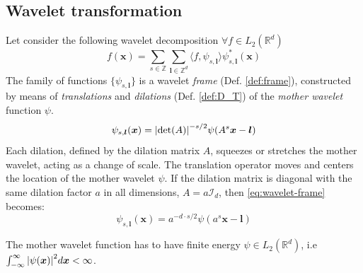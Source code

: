 \documentclass{InsightArticle}
\theoremstyle{definition}
\newcommand{\conj}[1]{#1^{\ast}}
\begin{document}
\subsection{Wavelet transformation}
\label{sub:transform}

Let consider the following wavelet decomposition $\forall f \in L_2(\mathbb{R}^d)$
\begin{equation}
    f(\bm{x}) = \sum_{s \in \mathbb{Z}} \sum_{\bm{l} \in \mathbb{Z}^d} \langle f,\psi_{s,\bm{l}} \rangle \conj\psi_{s,\bm{l}}(\bm{x})
\end{equation}
The family of functions $\{\psi_{s,\bm{l}}\}$ is a wavelet \textit{frame} (Def. \ref{def:frame}), constructed by means of \textit{translations} and \textit{dilations} (Def. \ref{def:D_T}) of the \textit{mother wavelet} function $\psi$.
\begin{equation}
    \psi_{s,\bm{l}}(\bm{x}) = \abs{\det(A)}^{-s/2}\psi(A^s\bm{x} - \bm{l})
\label{eq:wavelet-frame}
\end{equation}
Each dilation, defined by the dilation matrix $A$, squeezes or stretches the mother wavelet, acting as a change of scale. The translation operator moves and centers the location of the mother wavelet $\psi$. If the dilation matrix is diagonal with the same dilation factor $a$ in all dimensions, $A = a \mathcal{I}_d$, then \autoref{eq:wavelet-frame} becomes:
\begin{equation}
    \psi_{s,\bm{l}}(\bm{x}) = a^{-d\cdot s/2}\psi(a^s\bm{x} - \bm{l})
\end{equation}

The mother wavelet function has to have finite energy $\psi \in L_2(\mathbb{R}^d)$, i.e $\int_{-\infty}^{\infty}\abs{\psi(\bm{x})}^2 d\bm{x} < \infty $.\newline
\end{document}
